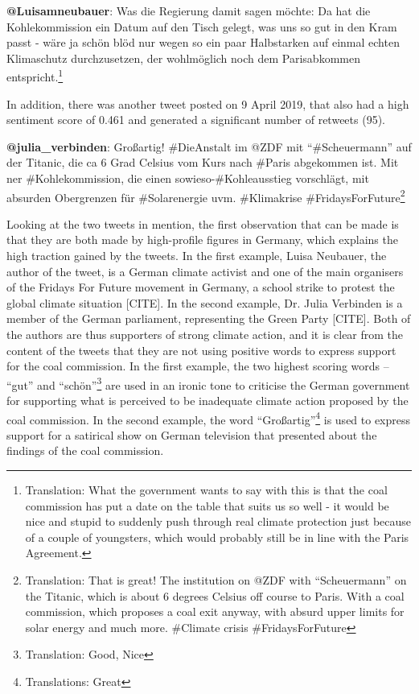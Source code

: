 \documentclass[12pt,onecolumn,twoside]{layout}
\begin{document}
\begin{displayquote}
	\textbf{@Luisamneubauer}: Was die Regierung damit sagen möchte: Da hat die Kohlekommission ein Datum auf den Tisch gelegt, was uns so gut in den Kram passt - wäre ja schön blöd nur wegen so ein paar Halbstarken auf einmal echten Klimaschutz durchzusetzen, der wohlmöglich noch dem Parisabkommen entspricht.\footnote{Translation: What the government wants to say with this is that the coal commission has put a date on the table that suits us so well - it would be nice and stupid to suddenly push through real climate protection just because of a couple of youngsters, which would probably still be in line with the Paris Agreement.}
\end{displayquote}

In addition, there was another tweet posted on 9 April 2019, that also had a high sentiment score of 0.461 and generated a significant number of retweets (95). 

\begin{displayquote}
	\textbf{@julia\_verbinden}: Großartig! \#DieAnstalt im @ZDF mit ``\#Scheuermann'' auf der Titanic, die ca 6 Grad Celsius vom Kurs nach \#Paris abgekommen ist. Mit ner \#Kohlekommission, die einen sowieso-\#Kohleausstieg vorschlägt, mit absurden Obergrenzen für \#Solarenergie uvm. \#Klimakrise \#FridaysForFuture\footnote{Translation: That is great! The institution on @ZDF with ``Scheuermann'' on the Titanic, which is about 6 degrees Celsius off course to Paris. With a coal commission, which proposes a coal exit anyway, with absurd upper limits for solar energy and much more.  \#Climate crisis \#FridaysForFuture}
\end{displayquote}

Looking at the two tweets in mention, the first observation that can be made is that they are both made by high-profile figures in Germany, which explains the high traction gained by the tweets. In the first example, Luisa Neubauer, the author of the tweet, is a German climate activist and one of the main organisers of the Fridays For Future movement in Germany, a school strike to protest the global climate situation [CITE]. In the second example, Dr. Julia Verbinden is a member of the German parliament, representing the Green Party [CITE]. Both of the authors are thus supporters of strong climate action, and it is clear from the content of the tweets that they are not using positive words to express support for the coal commission. In the first example, the two highest scoring words -- ``gut'' and ``schön''\footnote{Translation: Good, Nice} are used in an ironic tone to criticise the German government for supporting what is perceived to be inadequate climate action proposed by the coal commission. In the second example, the word ``Großartig''\footnote{Translations: Great} is used to express support for a satirical show on German television that presented about the findings of the coal commission. 
\end{document}
